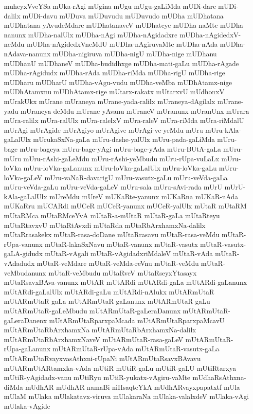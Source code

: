 {muheyxVveYSa
mUka-rAgi
mUgina
mUgu
mUgu-gaLiMda
mUDi-dare
mUDi-dalilx
mUDi-davu
mUDuva
mUDuvudu
mUDuvudo
mUDha
mUDhatana
mUDhatana-yAvudeMdare
mUDhatanaveV
mUDhateye
mUDha-naMte
mUDha-nanunx
mUDha-nalUlx
mUDha-nAgi
mUDha-nAgidadxre
mUDha-nAgidedxV-neMdu
mUDha-nAgidedxVneMdU
mUDha-nAgiruvaMte
mUDha-nAda
mUDha-nAdava-nanunx
mUDha-nigiruva
mUDha-nigU
mUDha-nige
mUDhanu
mUDhanU
mUDhaneV
mUDha-budidhxge
mUDha-mati-gaLu
mUDha-rAgade
mUDha-rAgidudx
mUDha-rAda
mUDha-riMda
mUDha-rigU
mUDha-rige
mUDharu
mUDharU
mUDha-vAgu-vudu
mUDha-veMba
mUDhAtamx-nige
mUDhAtamxnu
mUDhAtamx-rige
mUtarx-rakatx
mUtarxvU
mUdhonxV
mUrakUkx
mUrane
mUraneya
mUrane-yada-ralilx
mUraneya-dAgilalx
mUrane-yadu
mUraneya-deMdu
mUrane-yAvanu
mUraneV
mUranunx
mUranUnx
mUrara
mUra-ralilx
mUra-ralUlx
mUra-ralelxV
mUra-raleV
mUra-riMda
mUra-riMdalU
mUrAgi
mUrAgide
mUrAgiyo
mUrAgive
mUrAgi-ve-yeMdu
mUru
mUru-kAla-gaLalUlx
mUrukaSxNa-gaLa
mUru-dashe-yalUlx
mUru-pada-gaLiMda
mUru-bage
mUru-bageya
mUru-bage-yAgi
mUru-bage-yAda
mUru-BUtA-gaLa
mUru-mUru
mUru-rAshi-gaLeMdu
mUru-rAshi-yeMbudu
mUru-rUpa-vuLaLx
mUru-loVka
mUru-loVka-gaLanunx
mUru-loVka-gaLalUlx
mUru-loVka-gaLu
mUru-loVka-gaLeV
mUru-vaNaR-davarigU
mUru-vasutx-gaLu
mUru-veVda-gaLa
mUru-veVda-gaLu
mUru-veVda-gaLeV
mUru-sala
mUru-sAvi-rada
mUrU
mUrU-kAla-gaLalUlx
mUreMdu
mUreV
mUKaRte-yanunx
mUKaRna
mUKaR-nAda
mUKaRru
mUCARdi
mUCeR
mUCeR-yanunx
mUCeR-yalUlx
mUtaR
mUtaRM
mUtaRMca
mUtaRMceYvA
mUtaR-a-mUtaR
mUtaR-gaLa
mUtaRteyu
mUtaRtavxvU
mUtaRtAvxdi
mUtaRda
mUtaRbArxhamxNa-dalilx
mUtaRrasakekx
mUtaR-rasa-doDane
mUtaRrasavu
mUtaR-rasa-veMdu
mUtaR-rUpa-vanunx
mUtaR-lakaSxNavu
mUtaR-vanunx
mUtaR-vasutx
mUtaR-vasutx-gaLA-gidudx
mUtaR-vAgali
mUtaR-vAgidadxriMdaleV
mUtaR-vAda
mUtaR-vAdadudx
mUtaR-veMdare
mUtaR-veMda-reVnu
mUtaR-veMdu
mUtaR-veMbudanunx
mUtaR-veMbudu
mUtaRveV
mUtaRseyxYtasayx
mUtaRsavxBAva-vanunx
mUtAR
mUtARdi
mUtARdi-gaLa
mUtARdi-gaLanunx
mUtARdi-gaLalUlx
mUtARdi-gaLu
mUtARdi-nAlukx
mUtARmUtaR
mUtARmUtaR-gaLa
mUtARmUtaR-gaLanunx
mUtARmUtaR-gaLu
mUtARmUtaR-gaLeMbudu
mUtARmUtaR-gaLeraDanunx
mUtARmUtaR-gaLeraDanenx
mUtARmUtaRparxpaMcada
mUtARmUtaRparxpaMcavU
mUtARmUtaRbArxhamxNa
mUtARmUtaRbArxhamxNa-dalilx
mUtARmUtaRbArxhamxNaveV
mUtARmUtaR-rasa-gaLeV
mUtARmUtaR-rUpa-gaLanunx
mUtARmUtaR-rUpa-vAda
mUtARmUtaR-vasutx-gaLa
mUtARmUtaRvayxvasAthxni-rUpaNi
mUtARmUtaRsavxBAvavu
mUtARmUtARtamxka-vAda
mUtiR
mUtiR-gaLu
mUtiR-gaLU
mUtiRtarxya
mUtiR-yAgidadx-vanu
mUtiRyu
mUtiR-yukatx-vAgiru-vaMte
mUdhaRsAthxna-diMda
mUdhAR
mUdhAR-namaBi-niHsaqteYkA
mUdhARvayxpapatxtf
mUla
mUlaM
mUlaka
mUlakatavx-viruva
mUlakaraNa
mUlaka-valalxdeV
mUlaka-vAgi
mUlaka-vAgide
}
